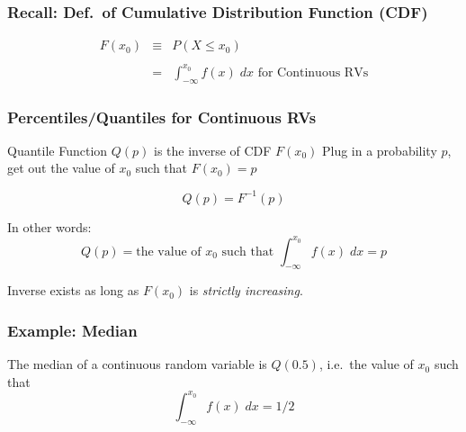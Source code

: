 \documentclass[handout]{beamer}
\begin{document}
\begin{frame}
\frametitle{Recall: Def.\ of Cumulative Distribution Function (CDF)}


\begin{eqnarray*}
F(x_0) &\equiv& P(X \leq x_0) \\ \\
		&=& \int_{-\infty}^{x_0} f(x)\; dx \mbox{ for Continuous RVs}
\end{eqnarray*}


\end{frame}
\begin{frame}
\frametitle{Percentiles/Quantiles for Continuous RVs}
\begin{block}{Quantile Function $Q(p)$ is the inverse of CDF $F(x_0)$}
Plug in a probability $p$, get out the value of $x_0$ such that $F(x_0)=p$
\end{block}
$$Q(p) = F^{-1}(p)$$

In other words:
	$$Q(p) = \mbox{the value of } x_0 \mbox{ such that } \int_{-\infty}^{x_0} f(x) \; dx = p$$
	
\begin{alertblock}{Inverse exists as long as $F(x_0)$ is \emph{strictly increasing}.} \end{alertblock}	
	
\end{frame}
\begin{frame}
\frametitle{Example: Median}
The median of a continuous random variable is $Q(0.5)$, i.e.\ the value of $x_0$ such that 
	$$\int_{-\infty}^{x_0} f(x)\; dx = 1/2$$
\end{frame}
\end{document}
